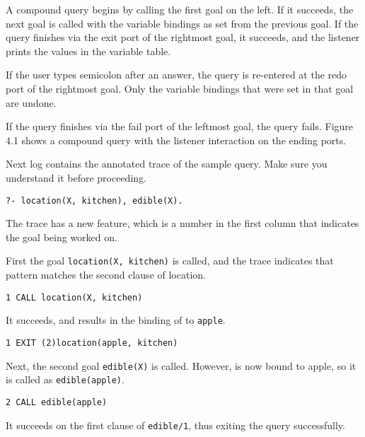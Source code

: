A compound query begins by calling the first goal on the left. If it succeeds,
the next goal is called with the variable bindings as set from the previous
goal. If the query finishes via the exit port of the rightmost goal, it
succeeds, and the listener prints the values in the variable table.

If the user types semicolon \keys{;} after an answer, the query is re-entered at
the redo port of the rightmost goal. Only the variable bindings that were set in
that goal are undone.

If the query finishes via the fail port of the leftmost goal, the query fails.
Figure 4.1 shows a compound query with the listener interaction on the ending
ports.


\secdown
{}

Next log contains the annotated trace of the sample query. Make sure you
understand it before proceeding.

\bigskip

\begin{verbatim}
?- location(X, kitchen), edible(X).
\end{verbatim}
The trace has a new feature, which is a number in the first column that
indicates the goal being worked on.

First the goal \verb|location(X, kitchen)| is called, and the trace
indicates that pattern matches the second clause of location.

\begin{verbatim}
1 CALL location(X, kitchen)
\end{verbatim}

It succeeds, and results in the binding of  to \verb|apple|.

\begin{verbatim}
1 EXIT (2)location(apple, kitchen)
\end{verbatim}

Next, the second goal \verb|edible(X)| is called. However,  is now bound
to apple, so it is called as \verb|edible(apple)|.

\begin{verbatim}
2 CALL edible(apple)
\end{verbatim}

It succeeds on the first clause of \verb|edible/1|, thus exiting the query
successfully.

